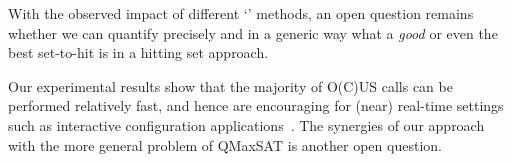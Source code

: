 

With the observed impact of different `\grow' methods, an open question remains whether we can quantify precisely and in a generic way what a \textit{good} or even the best set-to-hit is in a hitting set approach. 

Our experimental results show that the majority of O(C)US calls can be performed relatively fast, and hence are encouraging for (near) real-time settings such as interactive configuration applications~\cite{van2017kb}.
%
%
The synergies of our approach with the more general problem of QMaxSAT \cite{DBLP:journals/constraints/IgnatievJM16} is another open question.


